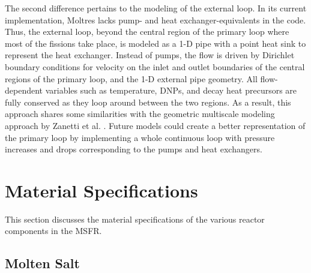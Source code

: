 The second difference pertains to the modeling of the external loop. In its
current implementation, Moltres lacks pump- and heat exchanger-equivalents in
the code. Thus, the external loop, beyond the central region of the primary
loop where most of the fissions take place, is modeled as a 1-D pipe with a
point heat sink to represent the heat exchanger. Instead of pumps, the flow is
driven by Dirichlet boundary conditions for velocity on the inlet and outlet
boundaries of the central regions of the primary loop, and the 1-D external
pipe geometry. All flow-dependent variables such as temperature, \glspl{DNP},
and decay heat precursors are fully conserved as they loop around between the
two regions. As a result, this approach shares some similarities with the
geometric multiscale modeling approach by Zanetti et al.
\cite{zanetti_geometric_2015}. Future models could
create a better representation of the primary loop by implementing a whole
continuous loop with pressure increases and drops corresponding to the pumps
and heat exchangers.

\section{Material Specifications}

This section discusses the material specifications of the various reactor
components in the \gls{MSFR}.

\subsection{Molten Salt}

